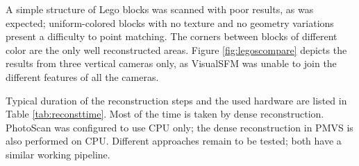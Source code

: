 


A simple structure of Lego blocks was scanned with poor results, as was expected; uniform-colored blocks with no texture and no geometry variations present a difficulty to point matching.
The corners between blocks of different color are the only well reconstructed areas.
Figure \ref{fig:legoscompare} depicts the results from three vertical cameras only, as VisualSFM was unable to join the different features of all the cameras.


Typical duration of the reconstruction steps and the used hardware are listed in Table \ref{tab:reconsttime}.
Most of the time is taken by dense reconstruction.
PhotoScan was configured to use CPU only; the dense reconstruction in PMVS is also performed on CPU.
Different approaches remain to be tested; both have a similar working pipeline.

